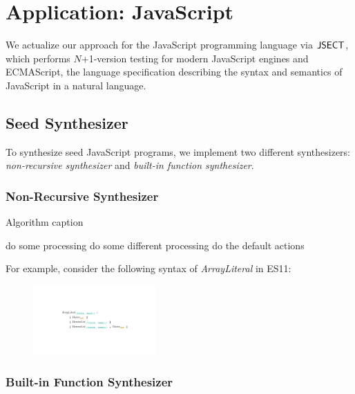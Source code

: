 \section{Application: JavaScript}\label{sec:application}

We actualize our approach for the JavaScript programming language via $\text{\sf JSECT}$,
which performs $N$+1-version testing for modern JavaScript engines and
ECMAScript, the language specification describing the syntax and semantics of
JavaScript in a natural language.

\subsection{Seed Synthesizer}

To synthesize seed JavaScript programs, we implement two different
synthesizers: \textit{non-recursive synthesizer} and \textit{built-in function
synthesizer}.

\subsubsection{Non-Recursive Synthesizer}

\begin{algorithm}[t]
  \caption{Algorithm caption}
  \label{alg:algorithm-label}
  \begin{algorithmic}
    \STATE {}
      \STATE do some processing
      \STATE do some different processing
    \ELSE
      \STATE do the default actions
    \ENDIF
  \end{algorithmic}
\end{algorithm}

For example, consider the following syntax of \textit{ArrayLiteral} in ES11:
\begin{figure}[H]
  \centering
  \includegraphics[width=0.42\textwidth]{img/syntax-arrayliteral.pdf}
\end{figure}


\subsubsection{Built-in Function Synthesizer}


